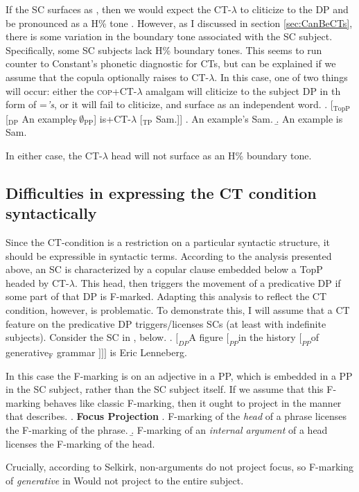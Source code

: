 \documentclass[
	letterpaper,
]{article}
\begin{document}
If the SC surfaces as \Last, then we would expect the CT-$\lambda$ to cliticize to the DP and be pronounced as a H\% tone \parencite[following][]{constant2014diss}.
However, as I discussed in section \ref{sec:CanBeCTs}, there is some variation in the boundary tone associated with the SC subject.
Specifically, some SC subjects lack H\% boundary tones.
This seems to run counter to Constant's phonetic diagnostic for CTs, but can be explained if we assume that the copula optionally raises to CT-$\lambda$.
In this case, one of two things will occur: either the \textsc{cop}+CT-$\lambda$ amalgam will cliticize to the subject DP in th form of =\textit{'s}, or it will fail to cliticize, and surface as an independent word.
\ex. [$_\text{TopP}$ [$_\text{DP}$ An example$_\text{F}\,\emptyset_\text{PP}$] is+CT-$\lambda$ [$_\text{TP}$ Sam.]]
\a. An example's Sam.
\b. An example is Sam.

In either case, the CT-$\lambda$ head will not surface as an H\% boundary tone.

\subsection{Difficulties in expressing the CT condition syntactically}
Since the CT-condition is a restriction on a particular syntactic structure, it should be expressible in syntactic terms.
According to the analysis presented above, an SC is characterized by a copular clause embedded below a TopP headed by CT-$\lambda$.
This head, then triggers the movement of a predicative DP if some part of that DP is F-marked.
Adapting this analysis to reflect the CT condition, however, is problematic.
To demonstrate this, I will assume that a CT feature on the predicative DP triggers/licenses SCs (at least with indefinite subjects).
Consider the SC in \Next, below.
\ex. $[_{DP}$A figure $[_{PP}$in the history $[_{PP}$of generative$_\text{F}$ grammar $]]]$ is Eric Lenneberg.

In this case the F-marking is on an adjective in a PP, which is embedded in a PP in the SC subject, rather than the SC subject itself.
If we assume that this F-marking behaves like classic F-marking, then it ought to project in the manner that \textcite{selkirk1996sentence} describes.
\ex. \textbf{Focus Projection} \parencite{selkirk1996sentence}
\a. F-marking of the \textit{head} of a phrase licenses the F-marking of the phrase.
\b. F-marking of an \textit{internal argument} of a head licenses the F-marking of the head.

Crucially, according to Selkirk, non-arguments do not project focus, so F-marking of \textit{generative} in \LLast Would not project to the entire subject.
\end{document}
